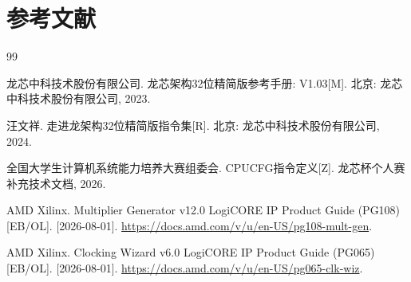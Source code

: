 \documentclass[UTF8,a4paper,zihao=5,fontset=none]{ctexart}
\newcommand{\songti}{\CJKfamily{rm}}
\begin{document}
\section{参考文献}
\renewcommand{\refname}{}
\begingroup
{}\songti
\setlength{\baselineskip}{16pt}
\begin{thebibliography}{99}

  龙芯中科技术股份有限公司. 龙芯架构32位精简版参考手册: V1.03[M]. 北京: 龙芯中科技术股份有限公司, 2023.

  汪文祥. 走进龙架构32位精简版指令集[R]. 北京: 龙芯中科技术股份有限公司, 2024.

  全国大学生计算机系统能力培养大赛组委会. CPUCFG指令定义[Z]. 龙芯杯个人赛补充技术文档, 2026.

  AMD Xilinx. Multiplier Generator v12.0 LogiCORE IP Product Guide (PG108)[EB/OL]. [2026-08-01]. \url{https://docs.amd.com/v/u/en-US/pg108-mult-gen}.

  AMD Xilinx. Clocking Wizard v6.0 LogiCORE IP Product Guide (PG065)[EB/OL]. [2026-08-01]. \url{https://docs.amd.com/v/u/en-US/pg065-clk-wiz}.

\end{thebibliography}
\endgroup
\end{document}
